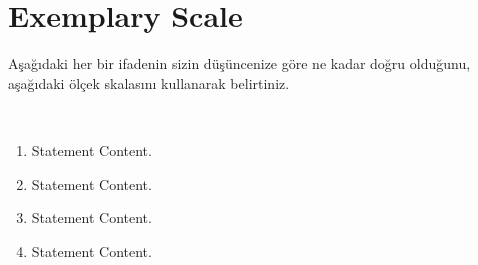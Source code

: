 \chapter {Exemplary Scale}
\label {chp:appendixC}
Aşağıdaki her bir ifadenin sizin düşüncenize göre ne kadar doğru olduğunu, aşağıdaki ölçek skalasını kullanarak belirtiniz.\\

\hspace{2.5cm} \par
\hspace{1cm} \\

\begin{enumerate}
\item Statement Content.
\item Statement Content.
\item Statement Content.
\item Statement Content.
\end{enumerate}

